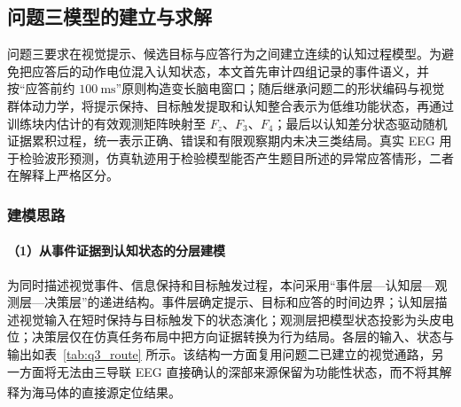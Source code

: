 \documentclass[a4paper,zihao=-4,linespread=1]{ctexart}
\numberwithin{figure}{section}       %
\newcommand{\upcite}[1]{\textsuperscript{\cite{#1}}} %
\begin{document}
\subsection{问题三模型的建立与求解}

问题三要求在视觉提示、候选目标与应答行为之间建立连续的认知过程模型。为避免把应答后的动作电位混入认知状态，本文首先审计四组记录的事件语义，并按“应答前约 $100~\mathrm{ms}$”原则构造变长脑电窗口；随后继承问题二的形状编码与视觉群体动力学，将提示保持、目标触发提取和认知整合表示为低维功能状态，再通过训练块内估计的有效观测矩阵映射至 $F_z$、$F_3$、$F_4$；最后以认知差分状态驱动随机证据累积过程，统一表示正确、错误和有限观察期内未决三类结局。真实 EEG 用于检验波形预测，仿真轨迹用于检验模型能否产生题目所述的异常应答情形，二者在解释上严格区分。

\subsubsection{建模思路}

\paragraph{（1）从事件证据到认知状态的分层建模}

为同时描述视觉事件、信息保持和目标触发过程，本问采用“事件层---认知层---观测层---决策层”的递进结构。事件层确定提示、目标和应答的时间边界；认知层描述视觉输入在短时保持与目标触发下的状态演化；观测层把模型状态投影为头皮电位；决策层仅在仿真任务布局中把方向证据转换为行为结局。各层的输入、状态与输出如表~\ref{tab:q3_route} 所示。该结构一方面复用问题二已建立的视觉通路，另一方面将无法由三导联 EEG 直接确认的深部来源保留为功能性状态，而不将其解释为海马体的直接源定位结果\upcite{he2025eegmodels,daume2024control}。

\begin{table}[H]
\centering
\caption{认知模型分层结构表}
\label{tab:q3_route}
\end{table}
\end{document}
